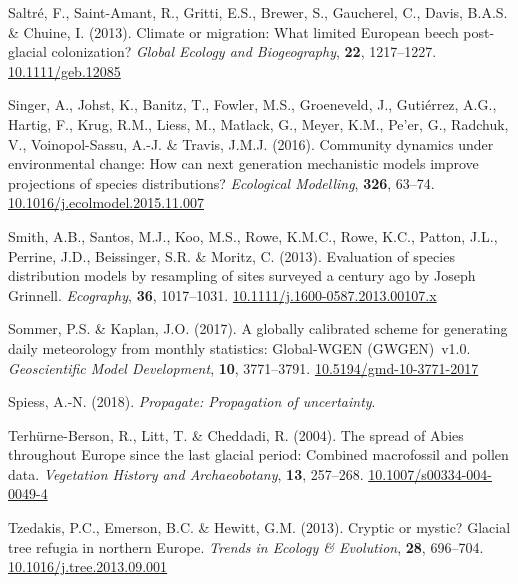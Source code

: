 \documentclass[11pt,]{article}
\newlength{\cslhangindent}
\newenvironment{CSLReferences}[2] %
 {%
  \setlength{\parindent}{0pt}
  \ifodd #1 \everypar{\setlength{\hangindent}{\cslhangindent}}\ignorespaces\fi
  \ifnum #2 > 0
  \setlength{\parskip}{#2\baselineskip}
  \fi
 }%
 {}
\begin{document}
\begin{CSLReferences}{1}{0}
\leavevmode{}%
Saltré, F., Saint-Amant, R., Gritti, E.S., Brewer, S., Gaucherel, C.,
Davis, B.A.S. \& Chuine, I. (2013). Climate or migration: What limited
{European} beech post-glacial colonization? \emph{Global Ecology and
Biogeography}, \textbf{22}, 1217--1227.
\href{https://doi.org/10.1111/geb.12085}{10.1111/geb.12085}

\leavevmode{}%
Singer, A., Johst, K., Banitz, T., Fowler, M.S., Groeneveld, J.,
Gutiérrez, A.G., Hartig, F., Krug, R.M., Liess, M., Matlack, G., Meyer,
K.M., Pe'er, G., Radchuk, V., Voinopol-Sassu, A.-J. \& Travis, J.M.J.
(2016). Community dynamics under environmental change: {How} can next
generation mechanistic models improve projections of species
distributions? \emph{Ecological Modelling}, \textbf{326}, 63--74.
\href{https://doi.org/10.1016/j.ecolmodel.2015.11.007}{10.1016/j.ecolmodel.2015.11.007}

\leavevmode{}%
Smith, A.B., Santos, M.J., Koo, M.S., Rowe, K.M.C., Rowe, K.C., Patton,
J.L., Perrine, J.D., Beissinger, S.R. \& Moritz, C. (2013). Evaluation
of species distribution models by resampling of sites surveyed a century
ago by {Joseph} {Grinnell}. \emph{Ecography}, \textbf{36}, 1017--1031.
\href{https://doi.org/10.1111/j.1600-0587.2013.00107.x}{10.1111/j.1600-0587.2013.00107.x}

\leavevmode{}%
Sommer, P.S. \& Kaplan, J.O. (2017). A globally calibrated scheme for
generating daily meteorology from monthly statistics: Global-WGEN
(GWGEN)~v1.0. \emph{Geoscientific Model Development}, \textbf{10},
3771--3791.
\href{https://doi.org/10.5194/gmd-10-3771-2017}{10.5194/gmd-10-3771-2017}

\leavevmode{}%
Spiess, A.-N. (2018). \emph{Propagate: Propagation of uncertainty}.

\leavevmode{}%
Terhürne-Berson, R., Litt, T. \& Cheddadi, R. (2004). The spread of
{Abies} throughout {Europe} since the last glacial period: Combined
macrofossil and pollen data. \emph{Vegetation History and
Archaeobotany}, \textbf{13}, 257--268.
\href{https://doi.org/10.1007/s00334-004-0049-4}{10.1007/s00334-004-0049-4}

\leavevmode{}%
Tzedakis, P.C., Emerson, B.C. \& Hewitt, G.M. (2013). Cryptic or mystic?
{Glacial} tree refugia in northern {Europe}. \emph{Trends in Ecology \&
Evolution}, \textbf{28}, 696--704.
\href{https://doi.org/10.1016/j.tree.2013.09.001}{10.1016/j.tree.2013.09.001}


\end{CSLReferences}
\end{document}
